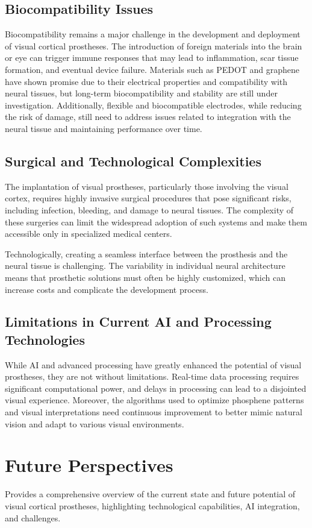 \documentclass[twocolumn,10pt]{article}
\begin{document}
\subsection*{Biocompatibility Issues}
Biocompatibility remains a major challenge in the development and deployment of visual cortical prostheses. The introduction of foreign materials into the brain or eye can trigger immune responses that may lead to inflammation, scar tissue formation, and eventual device failure. Materials such as PEDOT and graphene have shown promise due to their electrical properties and compatibility with neural tissues, but long-term biocompatibility and stability are still under investigation. Additionally, flexible and biocompatible electrodes, while reducing the risk of damage, still need to address issues related to integration with the neural tissue and maintaining performance over time.

\subsection*{Surgical and Technological Complexities}
The implantation of visual prostheses, particularly those involving the visual cortex, requires highly invasive surgical procedures that pose significant risks, including infection, bleeding, and damage to neural tissues. The complexity of these surgeries can limit the widespread adoption of such systems and make them accessible only in specialized medical centers.

Technologically, creating a seamless interface between the prosthesis and the neural tissue is challenging. The variability in individual neural architecture means that prosthetic solutions must often be highly customized, which can increase costs and complicate the development process.

\subsection*{Limitations in Current AI and Processing Technologies}
While AI and advanced processing have greatly enhanced the potential of visual prostheses, they are not without limitations. Real-time data processing requires significant computational power, and delays in processing can lead to a disjointed visual experience. Moreover, the algorithms used to optimize phosphene patterns and visual interpretations need continuous improvement to better mimic natural vision and adapt to various visual environments.

\section*{Future Perspectives}\label{sec:future}
Provides a comprehensive overview of the current state and future potential of
visual cortical prostheses, highlighting technological capabilities, AI
integration, and challenges.
\end{document}
